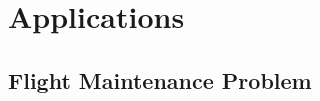 \documentclass[../main]{subfiles}
\begin{document}
\hypertarget{Applications}{%
  \section{Applications}\label{applications}}

\subsection{Flight Maintenance Problem}\label{repair}
\end{document}
